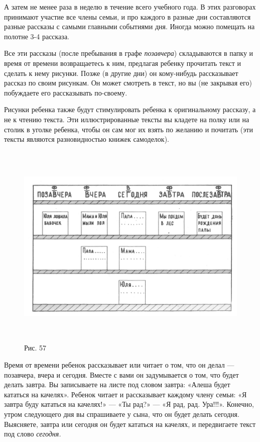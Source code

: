 \documentclass[a5paper]{book}
\renewcommand{\emph}[1]{\textit{#1}}
\begin{document}
А затем не менее раза в неделю в течение всего учебного года. В этих
разговорах принимают участие все члены семьи, и про каждого в разные дни
составляются разные рассказы с самыми главными событиями дня. Иногда
можно помещать на полотне 3-4 рассказа.

Все эти рассказы (после пребывания в графе \emph{позавчера})
складываются в папку и время от времени возвращаетесь к ним, предлагая
ребенку прочитать текст и сделать к нему рисунки. Позже (в другие дни)
он кому-нибудь рассказывает рассказ по своим рисункам. Он может смотреть
в текст, но вы (не закрывая его) побуждаете его рассказывать по-своему.

Рисунки ребенка также будут стимулировать ребенка к оригинальному
рассказу, а не к чтению текста. Эти иллюстрированные тексты вы кладете
на полку или на столик в уголке ребенка, чтобы он сам мог их взять по
желанию и почитать (эти тексты являются разновидностью книжек
самоделок).

\begin{figure}
\centering
\includegraphics[width=6.02917in,height=3.92799in]{media/media/image54.jpg}
\caption*{Рис. 57}
\end{figure}

Время от времени ребенок рассказывает или читает о том, что он делал ---
позавчера, вчера и сегодня. Вместе с вами он задумывается о том, что
будет делать завтра. Вы записываете на листе под словом завтра: «Алеша
будет кататься на качелях». Ребенок читает и рассказывает каждому члену
семьи: «Я завтра буду кататься на качелях!» --- «Ты рад?» --- «Я рад,
рад. Ура!!!». Конечно, утром следующего дня вы спрашиваете у сына, что
он будет делать сегодня. Выясняете, завтра или сегодня он будет кататься
на качелях, и передвигаете текст под слово \emph{сегодня.}
\end{document}

